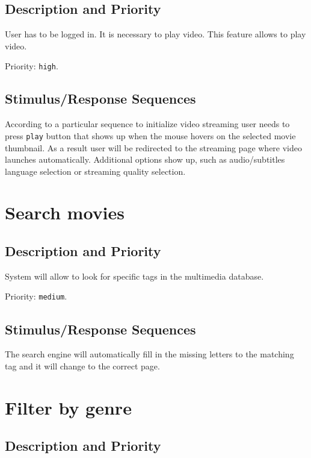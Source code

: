 \documentclass{scrreprt}
\begin{document}
\subsection{Description and Priority}

User has to be logged in. It is necessary to play video. This feature allows to play video.

Priority: \verb|high|.

\subsection{Stimulus/Response Sequences}

According to a particular sequence to initialize video streaming user needs to press \verb|play| button that shows up when the mouse hovers on the selected movie thumbnail. As a result user will be redirected to the streaming page where video launches automatically. Additional options show up, such as audio/subtitles language selection or streaming quality selection.

\section{Search movies}

\subsection{Description and Priority}

System will allow to look for specific tags in the multimedia database.

Priority: \verb|medium|.

\subsection {Stimulus/Response Sequences}

The search engine will automatically fill in the missing letters to the matching tag and it will change to the correct page. 

\section{Filter by genre}

\subsection{Description and Priority}
\end{document}
